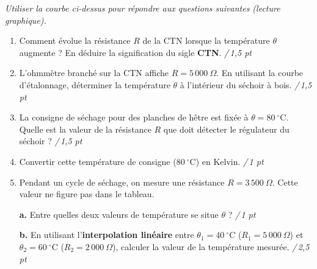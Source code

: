 \documentclass[a4paper,11pt]{article}
\newcommand{\pt}[1]{\hfill\textcolor{gris}{\small\textit{/\,#1 pt}}}
\begin{document}
\vspace{2pt}
\begin{center}\small\itshape Utiliser la courbe ci-dessus pour répondre aux questions suivantes (lecture graphique).\end{center}

\newpage
{}

\vspace{4pt}
\begin{enumerate}[label=\textbf{\arabic*.},leftmargin=*,itemsep=4pt]

\item Comment évolue la résistance $R$ de la CTN lorsque la température $\theta$ augmente ? En déduire la signification du sigle \textbf{CTN}. \pt{1,5}

\vspace{1.4cm}

\item L'ohmmètre branché sur la CTN affiche $R = 5\,000\ \Omega$. En utilisant la courbe d'étalonnage, déterminer la température $\theta$ à l'intérieur du séchoir à bois. \pt{1,5}

\vspace{1.4cm}

\item La consigne de séchage pour des planches de hêtre est fixée à $\theta = 80\ ^\circ$C. Quelle est la valeur de la résistance $R$ que doit détecter le régulateur du séchoir ? \pt{1,5}

\vspace{1.4cm}

\item Convertir cette température de consigne ($80\ ^\circ$C) en Kelvin. \pt{1}

\vspace{1.2cm}

\item Pendant un cycle de séchage, on mesure une résistance $R = 3\,500\ \Omega$. Cette valeur ne figure pas dans le tableau.\par
\textbf{a.} Entre quelles deux valeurs de température se situe $\theta$ ? \pt{1}

\vspace{1.2cm}

\textbf{b.} En utilisant l'\textbf{interpolation linéaire} entre $\theta_1 = 40\ ^\circ$C ($R_1 = 5\,000\ \Omega$) et $\theta_2 = 60\ ^\circ$C ($R_2 = 2\,000\ \Omega$), calculer la valeur de la température mesurée. \pt{2,5}

\vspace{2.2cm}
\end{enumerate}
\end{document}
